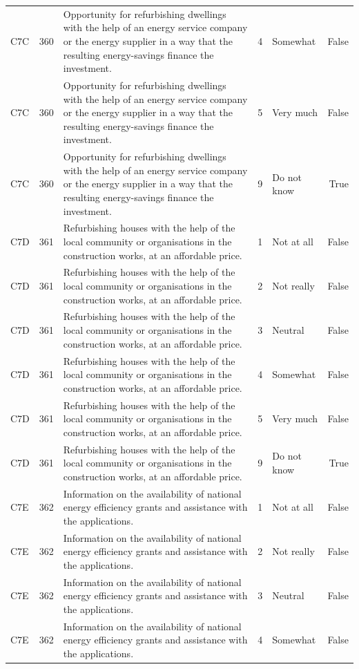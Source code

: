 \begin{tabular}{lrlllr}
C7C & 360 & Opportunity for refurbishing dwellings with the help of an energy service company or the energy supplier in a way that the resulting energy-savings finance the investment. & 4 & Somewhat & False \\
C7C & 360 & Opportunity for refurbishing dwellings with the help of an energy service company or the energy supplier in a way that the resulting energy-savings finance the investment. & 5 & Very much & False \\
C7C & 360 & Opportunity for refurbishing dwellings with the help of an energy service company or the energy supplier in a way that the resulting energy-savings finance the investment. & 9 & Do not know & True \\
C7D & 361 & Refurbishing houses with the help of the local community or organisations in the construction works, at an affordable price. & 1 & Not at all & False \\
C7D & 361 & Refurbishing houses with the help of the local community or organisations in the construction works, at an affordable price. & 2 & Not really & False \\
C7D & 361 & Refurbishing houses with the help of the local community or organisations in the construction works, at an affordable price. & 3 & Neutral & False \\
C7D & 361 & Refurbishing houses with the help of the local community or organisations in the construction works, at an affordable price. & 4 & Somewhat & False \\
C7D & 361 & Refurbishing houses with the help of the local community or organisations in the construction works, at an affordable price. & 5 & Very much & False \\
C7D & 361 & Refurbishing houses with the help of the local community or organisations in the construction works, at an affordable price. & 9 & Do not know & True \\
C7E & 362 & Information on the availability of national energy efficiency grants and assistance with the applications. & 1 & Not at all & False \\
C7E & 362 & Information on the availability of national energy efficiency grants and assistance with the applications. & 2 & Not really & False \\
C7E & 362 & Information on the availability of national energy efficiency grants and assistance with the applications. & 3 & Neutral & False \\
C7E & 362 & Information on the availability of national energy efficiency grants and assistance with the applications. & 4 & Somewhat & False \\

\end{tabular}
